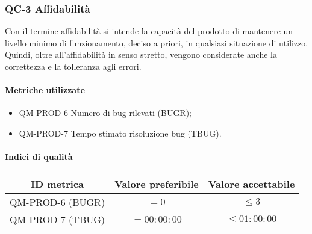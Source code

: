 \subsubsection{QC-3 Affidabilità}
Con il termine affidabilità si intende la capacità del prodotto di mantenere un livello minimo di funzionamento, deciso a priori, in qualsiasi situazione di utilizzo. Quindi, oltre all'affidabilità in senso stretto, vengono considerate anche la correttezza e la tolleranza agli errori.

	\paragraph{Metriche utilizzate}
	\begin{itemize}
		\item QM-PROD-6 Numero di bug rilevati (BUGR);
		\item QM-PROD-7 Tempo stimato risoluzione bug (TBUG).
	\end{itemize}

	\paragraph{Indici di qualità}
	\begin{center}
		\begin{tabular}{|c|c|c|}
			\rowcolor{lighter-grayer}
			\hline
			\textbf{ID metrica} & \textbf{Valore preferibile} & \textbf{Valore accettabile} \\
			\hline
			QM-PROD-6 (BUGR) & \(= 0\) &\(\le 3\) \\
			\hline
			QM-PROD-7 (TBUG) & \(= 00:00:00\) & \(\le 01:00:00\) \\
			\hline
		\end{tabular}
	\end{center}
